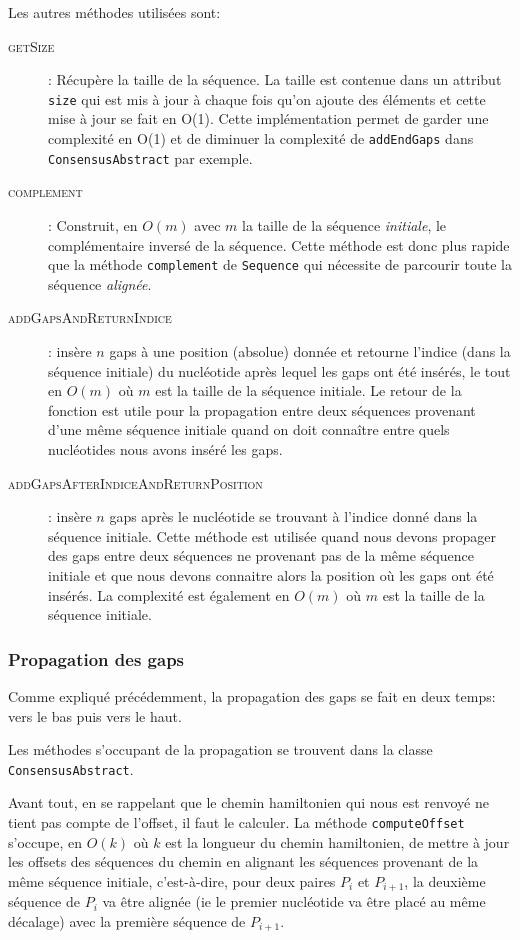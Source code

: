 Les autres méthodes utilisées sont:
\begin{description}
	\item[\textsc{getSize}]: Récupère la taille de la séquence. La taille est
		contenue dans un attribut \verb|size| qui est mis à jour à chaque fois
		qu'on ajoute des éléments et cette mise à jour se fait en O(1). Cette
		implémentation permet de garder une complexité en O(1) et de diminuer la
		complexité de \verb|addEndGaps| dans \verb|ConsensusAbstract| par
		exemple.
	\item[\textsc{complement}]: Construit, en $O(m)$ avec $m$ la taille de la
		séquence \textit{initiale}, le complémentaire inversé de la séquence.
		Cette méthode est donc plus rapide que la méthode \verb|complement| de
		\verb|Sequence| qui nécessite de parcourir toute la séquence
		\textit{alignée}.
	\item[\textsc{addGapsAndReturnIndice}]: insère $n$ gaps à
			une position (absolue) donnée et retourne l'indice (dans la séquence
			initiale) du nucléotide après lequel les gaps ont été insérés, le
			tout en $O(m)$ où $m$ est la taille de la séquence initiale. Le
			retour de la fonction est utile pour la propagation entre deux
			séquences provenant d'une même séquence initiale quand on doit
			connaître entre quels nucléotides nous avons inséré les gaps.
	\item[\textsc{addGapsAfterIndiceAndReturnPosition}]: insère $n$ gaps après
		le nucléotide se trouvant à l'indice donné dans la séquence initiale.
		Cette méthode est utilisée quand nous devons propager des gaps entre
		deux séquences ne provenant pas de la même séquence initiale et que nous
		devons connaitre alors la position où les gaps ont été insérés. La
		complexité est également en $O(m)$ où $m$ est la taille de la séquence
		initiale.
\end{description}

\subsubsection{Propagation des gaps}

Comme expliqué précédemment, la propagation des gaps se fait en deux temps: vers
le bas puis vers le haut.

Les méthodes s'occupant de la propagation se trouvent dans la classe
\verb|ConsensusAbstract|.

Avant tout, en se rappelant que le chemin hamiltonien qui nous est renvoyé ne
tient pas compte de l'offset, il faut le calculer. La méthode
\verb|computeOffset| s'occupe, en $O(k)$ où $k$ est la longueur du chemin
hamiltonien, de mettre à jour les offsets des séquences du chemin en alignant
les séquences provenant de la même séquence initiale, c'est-à-dire, pour deux
paires $P_{i}$ et $P_{i + 1}$, la deuxième séquence de $P_{i}$ va être alignée
(ie le premier nucléotide va être placé au même décalage) avec la première
séquence de $P_{i + 1}$.

